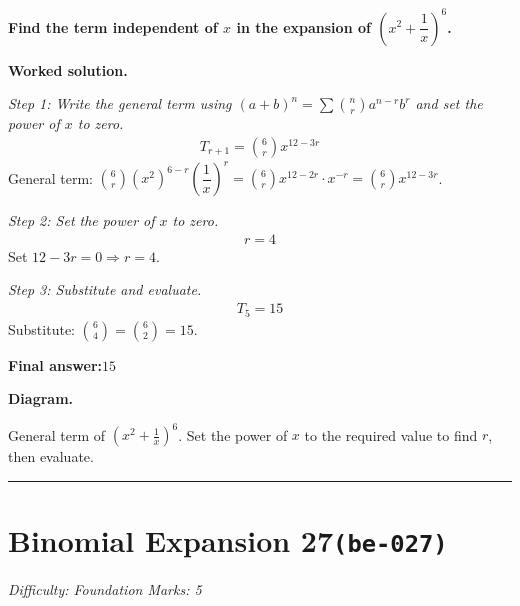 \documentclass[11pt]{article}
\newcommand{\question}[1]{\par\medskip\noindent\textbf{#1}\par}
\begin{document}
\question{Find the term independent of \( x \) in the expansion of \( \left(x^2 + \dfrac{1}{x}\right)^6 \).}

\textbf{Worked solution.}

\textit{Step 1: Write the general term using \((a+b)^n = \sum \binom{n}{r} a^{n-r} b^r\) and set the power of \(x\) to zero.}
\[\begin{gathered}
T_{r+1} = \binom{6}{r} x^{12-3r}
\end{gathered}\]
General term: \( \binom{6}{r}(x^2)^{6-r}\left(\dfrac{1}{x}\right)^r = \binom{6}{r} x^{12-2r} \cdot x^{-r} = \binom{6}{r} x^{12-3r} \).

\textit{Step 2: Set the power of \(x\) to zero.}
\[\begin{gathered}
r = 4
\end{gathered}\]
Set \(12 - 3r = 0 \Rightarrow r = 4\).

\textit{Step 3: Substitute and evaluate.}
\[\begin{gathered}
T_5 = 15
\end{gathered}\]
Substitute: \(\binom{6}{4} = \binom{6}{2} = 15\).

\begin{answerbox}
\textbf{Final answer:}\quad \(\displaystyle 15\)
\end{answerbox}
\textbf{Diagram.}

\begin{center}
\end{center}
\small General term of $\left(x^{2}+\frac{1}{x}\right)^{6}$. Set the power of $x$ to the required value to find $r$, then evaluate.\normalsize

\medskip\hrule

\section*{Binomial Expansion 27\quad\small\texttt{(be-027)}}
\textit{Difficulty: Foundation \quad\textbar\quad Marks: 5}
\end{document}
